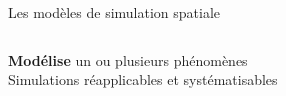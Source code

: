 \documentclass[xcolor=table]{beamer}
\begin{document}
\begin{frame}{Les modèles de simulation spatiale}
\begin{columns}[T]
\begin{column}[T]{7cm}
\begin{block}{}
\textbf{Modélise} un ou plusieurs phénomènes\\

Simulations réapplicables et systématisables\\

\end{block}
\end{column}
\begin{column}[T]{4cm}

\end{column}
\end{columns}
\end{frame}
\end{document}
